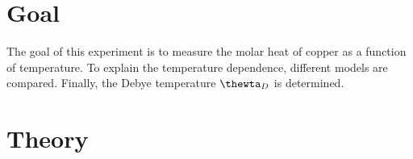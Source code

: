 


\section{Goal}
\label{sec:goal}
The goal of this experiment is to measure the molar heat of copper as a function of temperature.
To explain the temperature dependence, different models are compared.
Finally, the Debye temperature $\thewta_D$ is determined.

\section{Theory}
\label{sec:theory}

